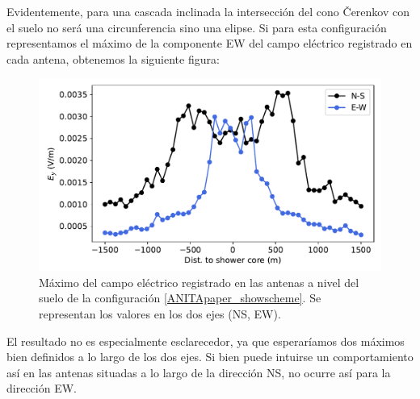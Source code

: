 \documentclass[12 pt, a4paper]{article} %
\numberwithin{equation}{section}
\numberwithin{figure}{section}
\numberwithin{table}{section}
\begin{document}
Evidentemente, para una cascada inclinada la intersección del cono \v{C}erenkov con el suelo no será una circunferencia sino una elipse. Si para esta configuración representamos el máximo de la componente EW del campo eléctrico registrado en cada antena, obtenemos la siguiente figura:
\begin{figure}[H]
	\centering
	\includegraphics[width=.6\linewidth]{figures/radio/downgoing_p_10EeV_70deg_Ey_t_ground}
	\caption{Máximo del campo eléctrico registrado en las antenas a nivel del suelo de la configuración \ref{ANITApaper_showscheme}. Se representan los valores en los dos ejes (NS, EW).}
	\label{downgoing_p_10EeV_70deg_Ey_t_ground}
\end{figure}
El resultado no es especialmente esclarecedor, ya que esperaríamos dos máximos bien definidos a lo largo de los dos ejes. Si bien puede intuirse un comportamiento así en las antenas situadas a lo largo de la dirección NS, no ocurre así para la dirección EW.


\end{document}
